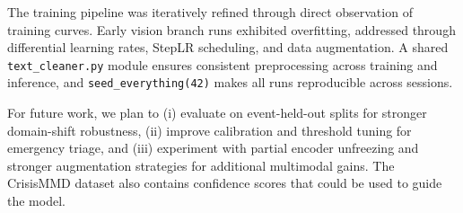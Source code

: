 \documentclass[11pt,letterpaper]{article}
\begin{document}
The training pipeline was iteratively refined through direct observation of training curves. Early vision branch runs exhibited overfitting, addressed through differential learning rates, StepLR scheduling, and data augmentation. A shared \texttt{text\_cleaner.py} module ensures consistent preprocessing across training and inference, and \texttt{seed\_everything(42)} makes all runs reproducible across sessions.

For future work, we plan to (i) evaluate on event-held-out splits for stronger domain-shift robustness, (ii) improve calibration and threshold tuning for emergency triage, and (iii) experiment with partial encoder unfreezing and stronger augmentation strategies for additional multimodal gains. The CrisisMMD dataset also contains confidence scores that could be used to guide the model.



\end{document}
